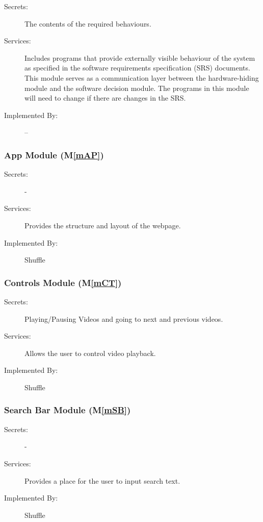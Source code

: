 \documentclass[12pt, titlepage]{article}
\newcommand{\mref}[1]{M\ref{#1}}
\begin{document}
\begin{description}
\item[Secrets:]The contents of the required behaviours.
\item[Services:]Includes programs that provide externally visible behaviour of
  the system as specified in the software requirements specification (SRS)
  documents. This module serves as a communication layer between the
  hardware-hiding module and the software decision module. The programs in this
  module will need to change if there are changes in the SRS.
\item[Implemented By:] --
\end{description}

\subsubsection{App Module (\mref{mAP})}

\begin{description}
\item[Secrets:] -
\item[Services:]Provides the structure and layout of the webpage.
\item[Implemented By:] Shuffle
\end{description}

\subsubsection{Controls Module (\mref{mCT})}

\begin{description}
\item[Secrets:] Playing/Pausing Videos and going to next and previous videos.
\item[Services:]Allows the user to control video playback.
\item[Implemented By:] Shuffle
\end{description}

\subsubsection{Search Bar Module (\mref{mSB})}

\begin{description}
\item[Secrets:] -
\item[Services:] Provides a place for the user to input search text.
\item[Implemented By:] Shuffle
\end{description}
\end{document}
